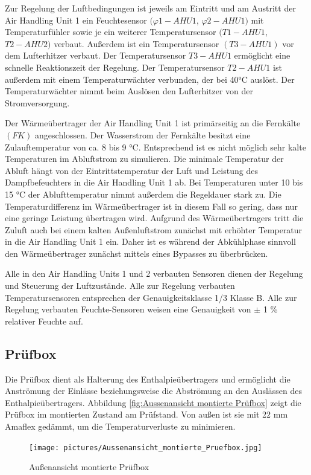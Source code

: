 Zur Regelung der Luftbedingungen ist jeweils am Eintritt und am Austritt der Air Handling Unit 1 ein Feuchtesensor $(\varphi1-AHU1$, $\varphi2-AHU1)$ mit Temperaturfühler sowie je ein weiterer Temperatursensor $(T1-AHU1$, $T2-AHU2)$ verbaut. Außerdem ist ein Temperatursensor $(T3-AHU1)$ vor dem Lufterhitzer verbaut. 
Der Temperatursensor $T3-AHU1$ ermöglicht eine schnelle Reaktionszeit der Regelung. Der Temperatursensor $T2-AHU1$ ist außerdem mit einem Temperaturwächter verbunden, der bei 40°C auslöst. Der Temperaturwächter nimmt beim Auslösen den Lufterhitzer von der Stromversorgung.

Der Wärmeübertrager der Air Handling Unit 1 ist primärseitig an die Fernkälte $(FK)$ angeschlossen. Der Wasserstrom der Fernkälte besitzt eine Zulauftemperatur von ca. 8 bis 9 °C. Entsprechend ist es nicht möglich sehr kalte Temperaturen im Abluftstrom zu simulieren. Die minimale Temperatur der Abluft hängt von der Eintrittstemperatur der Luft und Leistung des Dampfbefeuchters in die Air Handling Unit 1 ab. Bei Temperaturen unter 10 bis 15 °C der Ablufttemperatur nimmt außerdem die Regeldauer stark zu. Die Temperaturdifferenz im Wärmeübertrager ist in diesem Fall so gering, dass nur eine geringe Leistung übertragen wird. Aufgrund des Wärmeübertragers tritt die Zuluft auch bei einem kalten Außenluftstrom zunächst mit erhöhter Temperatur in die Air Handling Unit 1 ein. Daher ist es während der Abkühlphase sinnvoll den Wärmeübertrager zunächst mittels eines Bypasses zu überbrücken. 


Alle in den Air Handling Units 1 und 2 verbauten Sensoren dienen der Regelung und Steuerung der Luftzustände. Alle zur Regelung verbauten Temperatursensoren entsprechen der Genauigkeitsklasse 1/3 Klasse B. Alle zur Regelung verbauten Feuchte-Sensoren weisen eine Genauigkeit von $\pm$ 1 \% relativer Feuchte auf.

\subsection{Prüfbox}
\label{Prüfbox}

Die Prüfbox dient als Halterung des Enthalpieübertragers und ermöglicht die Anströmung der Einlässe beziehungsweise die Abströmung an den Auslässen des Enthalpieübertragers. Abbildung \ref{fig:Aussenansicht montierte Prüfbox} zeigt die Prüfbox im montierten Zustand am Prüfstand. Von außen ist sie mit 22 mm Amaflex gedämmt, um die Temperaturverluste zu minimieren.

\begin{figure} 
	\centering
	\texttt{[image: pictures/Aussenansicht\_montierte\_Pruefbox.jpg]}
	\caption{Außenansicht montierte Prüfbox}
	\label{fig:Aussenansicht montierte Pruefbox}
\end{figure}


